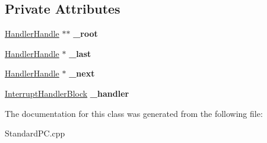 \subsection*{Private Attributes}
\begin{DoxyCompactItemize}
\item 
\mbox{\label{class_standard_p_c___internal_1_1_interrupts_1_1_handler_handle_a851e1bd553f6e2daee2aa40219d69140}} 
\hyperlink{class_standard_p_c___internal_1_1_interrupts_1_1_handler_handle}{Handler\+Handle} $\ast$$\ast$ {\bfseries \+\_\+root}
\item 
\mbox{\label{class_standard_p_c___internal_1_1_interrupts_1_1_handler_handle_a37c1e708e90b2022058ebd4b308c4ebd}} 
\hyperlink{class_standard_p_c___internal_1_1_interrupts_1_1_handler_handle}{Handler\+Handle} $\ast$ {\bfseries \+\_\+last}
\item 
\mbox{\label{class_standard_p_c___internal_1_1_interrupts_1_1_handler_handle_a575a50145ff91f9226edbb38987271eb}} 
\hyperlink{class_standard_p_c___internal_1_1_interrupts_1_1_handler_handle}{Handler\+Handle} $\ast$ {\bfseries \+\_\+next}
\item 
\mbox{\label{class_standard_p_c___internal_1_1_interrupts_1_1_handler_handle_a7c0725c18ced9e5baf85f76dfb66ba1d}} 
\hyperlink{classbicycle_1_1function}{Interrupt\+Handler\+Block} {\bfseries \+\_\+handler}
\end{DoxyCompactItemize}


The documentation for this class was generated from the following file\+:\begin{DoxyCompactItemize}
\item 
Standard\+P\+C.\+cpp\end{DoxyCompactItemize}
